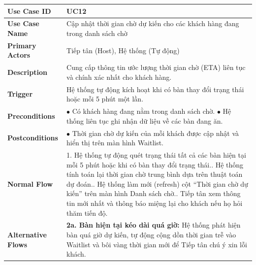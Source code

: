 \begin{longtable}{|L{3.5cm}|L{12.5cm}|}
\hline
\textbf{Use Case ID} & UC12 \\ \hline
\textbf{Use Case Name} & Cập nhật thời gian chờ dự kiến cho các khách hàng đang trong danh sách chờ \\ \hline
\textbf{Primary Actors} & Tiếp tân (Host), Hệ thống (Tự động) \\ \hline
\textbf{Description} & Cung cấp thông tin ước lượng thời gian chờ (ETA) liên tục và chính xác nhất cho khách hàng. \\ \hline
\textbf{Trigger} & Hệ thống tự động kích hoạt khi có bàn thay đổi trạng thái hoặc mỗi 5 phút một lần. \\ \hline
\textbf{Preconditions} &
$\bullet$ Có khách hàng đang nằm trong danh sách chờ.\newline
$\bullet$ Hệ thống liên tục ghi nhận dữ liệu về các bàn đang ăn. \\ \hline
\textbf{Postconditions} & $\bullet$ Thời gian chờ dự kiến của mỗi khách được cập nhật và hiển thị trên màn hình Waitlist. \\ \hline
\textbf{Normal Flow} &
1. Hệ thống tự động quét trạng thái tất cả các bàn hiện tại mỗi 5 phút hoặc khi có bàn thay đổi trạng thái.. Hệ thống tính toán lại thời gian chờ trung bình dựa trên thuật toán dự đoán.. Hệ thống làm mới (refresh) cột ``Thời gian chờ dự kiến'' trên màn hình Danh sách chờ.. Tiếp tân xem thông tin mới nhất và thông báo miệng lại cho khách nếu họ hỏi thăm tiến độ. \\ \hline
\textbf{Alternative Flows} &
\textbf{2a. Bàn hiện tại kéo dài quá giờ:} Hệ thống phát hiện bàn quá giờ dự kiến, tự động cộng dồn thời gian trễ vào Waitlist và bôi vàng thời gian mới để Tiếp tân chú ý xin lỗi khách. \\ \hline
\end{longtable}


